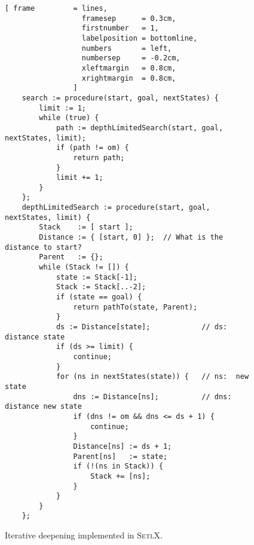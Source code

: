 \begin{figure}[!ht]
\centering
\begin{Verbatim}[ frame         = lines, 
                  framesep      = 0.3cm, 
                  firstnumber   = 1,
                  labelposition = bottomline,
                  numbers       = left,
                  numbersep     = -0.2cm,
                  xleftmargin   = 0.8cm,
                  xrightmargin  = 0.8cm,
                ]
    search := procedure(start, goal, nextStates) {
        limit := 1;
        while (true) {
            path := depthLimitedSearch(start, goal, nextStates, limit);
            if (path != om) {
                return path;
            }
            limit += 1;
        }
    };    
    depthLimitedSearch := procedure(start, goal, nextStates, limit) {
        Stack    := [ start ];
        Distance := { [start, 0] };  // What is the distance to start?
        Parent   := {};
        while (Stack != []) {
            state := Stack[-1];
            Stack := Stack[..-2];
            if (state == goal) {
                return pathTo(state, Parent);
            }
            ds := Distance[state];            // ds:  distance state 
            if (ds >= limit) {
                continue;
            }
            for (ns in nextStates(state)) {   // ns:  new state
                dns := Distance[ns];          // dns: distance new state
                if (dns != om && dns <= ds + 1) {
                    continue;
                }
                Distance[ns] := ds + 1;
                Parent[ns]   := state;
                if (!(ns in Stack)) {
                    Stack += [ns];
                }
            }
        }
    };
\end{Verbatim}
\vspace*{-0.3cm}
\caption{Iterative deepening implemented in \textsc{SetlX}.}
\label{fig:iterative-deepening.stlx}
\end{figure}

